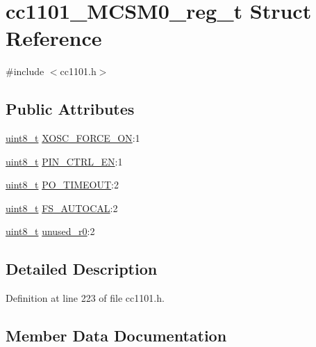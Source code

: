 \hypertarget{structcc1101___m_c_s_m0__reg__t}{}\section{cc1101\+\_\+\+M\+C\+S\+M0\+\_\+reg\+\_\+t Struct Reference}
\label{structcc1101___m_c_s_m0__reg__t}


{\ttfamily \#include $<$cc1101.\+h$>$}

\subsection*{Public Attributes}
\begin{DoxyCompactItemize}
\item 
\hyperlink{_p_e___types_8h_aba7bc1797add20fe3efdf37ced1182c5}{uint8\+\_\+t} \hyperlink{structcc1101___m_c_s_m0__reg__t_a3705b849fe23ee3667ad3ae0336dae98}{X\+O\+S\+C\+\_\+\+F\+O\+R\+C\+E\+\_\+\+ON}\+:1
\item 
\hyperlink{_p_e___types_8h_aba7bc1797add20fe3efdf37ced1182c5}{uint8\+\_\+t} \hyperlink{structcc1101___m_c_s_m0__reg__t_ad67d9ce01ee319f993a0efeea353bd27}{P\+I\+N\+\_\+\+C\+T\+R\+L\+\_\+\+EN}\+:1
\item 
\hyperlink{_p_e___types_8h_aba7bc1797add20fe3efdf37ced1182c5}{uint8\+\_\+t} \hyperlink{structcc1101___m_c_s_m0__reg__t_a4f679e86c5ec718fd6e8e4e8ae478728}{P\+O\+\_\+\+T\+I\+M\+E\+O\+UT}\+:2
\item 
\hyperlink{_p_e___types_8h_aba7bc1797add20fe3efdf37ced1182c5}{uint8\+\_\+t} \hyperlink{structcc1101___m_c_s_m0__reg__t_a84a171617083c6f904bafc50adc6ef90}{F\+S\+\_\+\+A\+U\+T\+O\+C\+AL}\+:2
\item 
\hyperlink{_p_e___types_8h_aba7bc1797add20fe3efdf37ced1182c5}{uint8\+\_\+t} \hyperlink{structcc1101___m_c_s_m0__reg__t_a482eb0779b29477c6caaf642c4e28073}{unused\+\_\+r0}\+:2
\end{DoxyCompactItemize}


\subsection{Detailed Description}


Definition at line 223 of file cc1101.\+h.



\subsection{Member Data Documentation}
